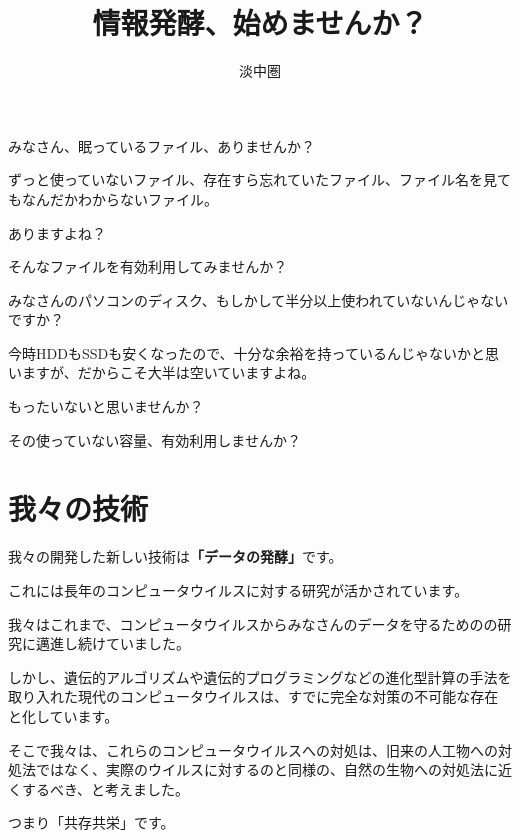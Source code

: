 \documentclass[12pt, unicode]{beamer}
\title{情報発酵、始めませんか？}
\author{淡中圏}
\date{}
\begin{document}
\frame{\titlepage}

\begin{frame}

みなさん、眠っているファイル、ありませんか？

ずっと使っていないファイル、存在すら忘れていたファイル、ファイル名を見てもなんだかわからないファイル。

ありますよね？

\end{frame}
\begin{frame}

\Large
\centerline{そんなファイルを有効利用してみませんか？}

\end{frame}

\begin{frame}

みなさんのパソコンのディスク、もしかして半分以上使われていないんじゃないですか？

今時HDDもSSDも安くなったので、十分な余裕を持っているんじゃないかと思いますが、だからこそ大半は空いていますよね。

もったいないと思いませんか？

\end{frame}
\begin{frame}

\Large
\centerline{その使っていない容量、有効利用しませんか？}

\end{frame}

\section{我々の技術}

\begin{frame}

我々の開発した新しい技術は\textbf{「データの発酵」}です。

これには長年のコンピュータウイルスに対する研究が活かされています。

\end{frame}
\begin{frame}

我々はこれまで、コンピュータウイルスからみなさんのデータを守るためのの研究に邁進し続けていました。

しかし、遺伝的アルゴリズムや遺伝的プログラミングなどの進化型計算の手法を取り入れた現代のコンピュータウイルスは、すでに完全な対策の不可能な存在と化しています。

そこで我々は、これらのコンピュータウイルスへの対処は、旧来の人工物への対処法ではなく、実際のウイルスに対するのと同様の、自然の生物への対処法に近くするべき、と考えました。

{\Large
\centerline{つまり「共存共栄」です。}
}
\end{frame}
\end{document}
